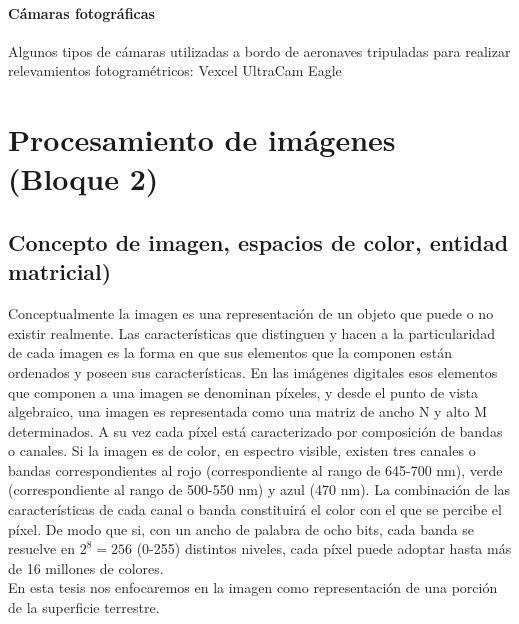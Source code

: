 \paragraph{Cámaras fotográficas}
Algunos tipos de cámaras utilizadas a bordo de aeronaves tripuladas para realizar relevamientos fotogramétricos:
Vexcel UltraCam Eagle


\section{Procesamiento de imágenes (Bloque 2)}

\subsection{Concepto de imagen, espacios de color, entidad matricial)}
Conceptualmente la imagen es una representación de un objeto que puede o no existir realmente. Las características que distinguen y hacen a la particularidad de cada imagen es la forma en que sus elementos que la componen están ordenados y poseen sus características. En las imágenes digitales esos elementos que componen a una imagen se denominan píxeles, y desde el punto de vista algebraico, una imagen es representada como una matriz de ancho N y alto M determinados. A su vez cada píxel está caracterizado por composición de bandas o canales. Si la imagen es de color, en espectro visible, existen tres canales o bandas correspondientes al rojo (correspondiente al rango de 645-700 nm), verde (correspondiente al rango de 500-550 nm) y azul (470 nm). La combinación de las características de cada canal o banda constituirá el color con el que se percibe el píxel. De modo que si, con un ancho de palabra de ocho bits, cada banda se resuelve en $2^8=256$ (0-255) distintos niveles, cada píxel puede adoptar hasta más de 16 millones de colores.\\
En esta tesis nos enfocaremos en la imagen como representación de una porción de la superficie terrestre.\\
